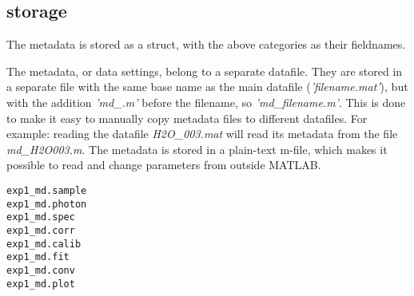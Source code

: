 \subsection {storage}
The metadata is stored as a struct, with the above categories as their fieldnames. 

The metadata, or data settings, belong to a separate datafile. They are stored in a separate file with the same base name as the main datafile (\emph{'filename.mat'}), but with the addition \emph{'md\_.m'} before the filename, so \emph{'md\_filename.m'}. This is done to make it easy to manually copy metadata files to different datafiles. For example: reading the datafile \emph{H2O\_003.mat} will read its metadata from the file \emph{md\_H2O003.m}. The metadata is stored in a plain-text m-file, which makes it possible to read and change parameters from outside MATLAB.

\lstset{language=MATLAB}
\begin{lstlisting}
exp1_md.sample
exp1_md.photon
exp1_md.spec
exp1_md.corr
exp1_md.calib
exp1_md.fit
exp1_md.conv
exp1_md.plot
\end{lstlisting}

